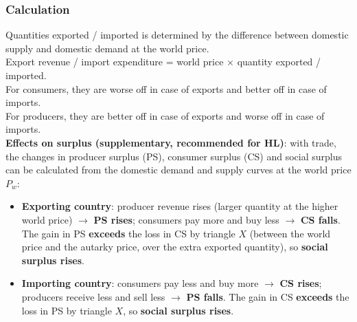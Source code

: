 \documentclass[a4paper,12pt]{article}
\begin{document}
\subsubsection*{Calculation}
Quantities exported / imported is determined by the difference between domestic supply and domestic demand at the world price. \\
Export revenue / import expenditure = world price $\times$ quantity exported / imported.\\
For consumers, they are worse off in case of exports and better off in case of imports. \\
For producers, they are better off in case of exports and worse off in case of imports.\\
\textbf{Effects on surplus (supplementary, recommended for HL)}: with trade, the changes in producer surplus (PS), consumer surplus (CS) and social surplus can be calculated from the domestic demand and supply curves at the world price $P_w$:
\begin{itemize}
  \item \textbf{Exporting country}: producer revenue rises (larger quantity at the higher world price) $\to$ \textbf{PS rises}; consumers pay more and buy less $\to$ \textbf{CS falls}. The gain in PS \textbf{exceeds} the loss in CS by triangle $X$ (between the world price and the autarky price, over the extra exported quantity), so \textbf{social surplus rises}.
  \item \textbf{Importing country}: consumers pay less and buy more $\to$ \textbf{CS rises}; producers receive less and sell less $\to$ \textbf{PS falls}. The gain in CS \textbf{exceeds} the loss in PS by triangle $X$, so \textbf{social surplus rises}.
\end{itemize}
\end{document}
